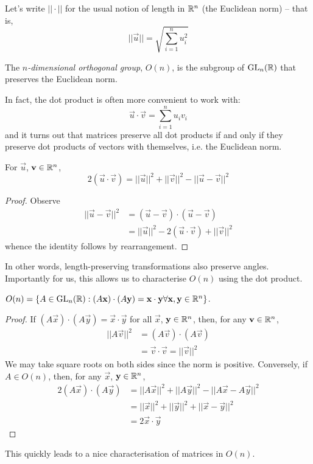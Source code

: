 \documentclass{../template/note}
\begin{document}
    Let's write \(||\cdot||\) for the usual notion of length in \(\mathbb R^n\) (the Euclidean norm) -- that is,
    \[
        ||\vec u|| = \sqrt{\sum_{i=1}^n u_i^2}
    \]

    \begin{definition}
        The \emph{\(n\)-dimensional orthogonal group}, \(O(n)\), is the subgroup of \(\operatorname{GL}_n(\mathbb R)\) that preserves the Euclidean norm.
    \end{definition}
    In fact, the dot product is often more convenient to work with:
    \[
        \vec u \cdot \vec v = \sum_{i=1}^n u_iv_i
    \]
    and it turns out that matrices preserve all dot products if and only if they preserve dot products of vectors with themselves, i.e. the Euclidean norm.

    \begin{lemma}
        For \(\vec u\), \(\vec v \in \RR^n\),
        \[
            2(\vec u \cdot \vec v) = ||\vec u||^2 + ||\vec v||^2 - ||\vec u - \vec v||^2
        \]
    \end{lemma}
    
    \begin{proof}
        Observe
        \begin{align*}
            ||\vec u - \vec v||^2 &= (\vec u - \vec v) \cdot (\vec u - \vec v) \\
            &= ||\vec u||^2 - 2(\vec u \cdot \vec v) + ||\vec v||^2
        \end{align*}
        whence the identity follows by rearrangement.
    \end{proof}
    In other words, length-preserving transformations also preserve angles. Importantly for us, this allows us to characterise \(O(n)\) using the dot product.
    \begin{lemma}
        \(O(n) = \{A \in \GL_n(\RR) : (A \vec x) \cdot (A \vec y) = \vec x \cdot \vec y \forall \vec x, \vec y \in \RR^n\}\).
    \end{lemma}
    
    \begin{proof}
        If \((A \vec x) \cdot (A \vec y) = \vec x \cdot \vec y\) for all \(\vec x\), \(\vec y \in \RR^n\), then, for any \(\vec v \in \RR^n\),
        \begin{align*}
            ||A \vec v||^2 &= (A \vec v) \cdot (A \vec v) \\
            &= \vec v \cdot \vec v = ||\vec v||^2
        \end{align*}
        We may take square roots on both sides since the norm is positive. Conversely, if \(A \in O(n)\), then, for any \(\vec x\), \(\vec y \in \RR^n\),
        \begin{align*}
            2(A \vec x) \cdot (A \vec y) &= ||A \vec x||^2 + ||A \vec y||^2 - ||A \vec x - A \vec y||^2 \\
            &= ||\vec x||^2 + ||\vec y||^2 + ||\vec x - \vec y||^2 \\
            &= 2 \vec x \cdot \vec y
        \end{align*}
    \end{proof}
    This quickly leads to a nice characterisation of matrices in \(O(n)\).
\end{document}
